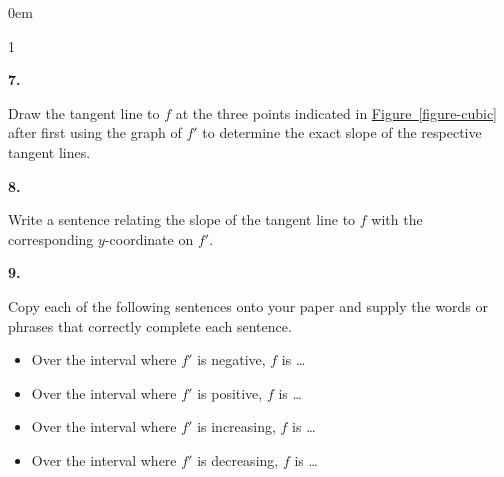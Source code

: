 \documentclass[12pt,]{book}
\theoremstyle{plain}
\theoremstyle{definition}
\numberwithin{equation}{section}
\newenvironment{exercisegroup}%
{\medskip\noindent}%
{\par\bigskip}%
\newlength{\exercisegroupindent}%
\newlength{\exercisegroupitemwidth}%
\newenvironment{exercisegrouplist}%
{\vspace{-\partopsep}%
\begin{adjustwidth}{\exercisegroupindent}{0em}}%
{\end{adjustwidth}%
\vspace{-\partopsep}%
\vspace{\baselineskip}}%
\newenvironment{exercisegroupbycol}[1]%
{\begin{exercisegrouplist}%
\vspace{-\multicolsep}%
\begin{multicols}{#1}%
\setlength{\parindent}{0em}%
\setlength{\exercisegroupitemwidth}{\linewidth}}%
{\end{multicols}%
\vspace{-\multicolsep}%
\end{exercisegrouplist}}%
\newenvironment{exercisegroupitem}[1]%
{\begin{minipage}[t]{\exercisegroupitemwidth}
\vspace{0pt}%
{\bfseries#1}%
\rule{0pt}{\baselineskip}}{\strut%
\end{minipage}%
\hspace{\columnsep}}%
\providecommand\phantomsection{}
\newcommand{\fd}[1]{#1'}
\begin{document}
\begin{exercisegroup}
\par
\begin{exercisegroupbycol}{1}%
\begin{exercisegroupitem}{7. }\phantomsection\hypertarget{exercise-216}{\null}
Draw the tangent line to \(f\) at the three points indicated in \hyperref[figure-cubic]{Figure~\ref*{figure-cubic}} after first using the graph of \(\fd{f}\) to determine the exact slope of the respective tangent lines.%
\end{exercisegroupitem}%
\par%
\begin{exercisegroupitem}{8. }\phantomsection\hypertarget{exercise-217}{\null}
Write a sentence relating the slope of the tangent line to \(f\) with the corresponding \(y\)-coordinate on \(\fd{f}\).%
\end{exercisegroupitem}%
\par%
\begin{exercisegroupitem}{9. }\phantomsection\hypertarget{exercise-218}{\null}
Copy each of the following sentences onto your paper and supply the words or phrases that correctly complete each sentence.%
\begin{itemize}[label=\textbullet]
\item{}Over the interval where \(\fd{f}\) is negative, \(f\) is \dots{}\item{}Over the interval where \(\fd{f}\) is positive, \(f\) is \dots{}\item{}Over the interval where \(\fd{f}\) is increasing, \(f\) is \dots{}\item{}Over the interval where \(\fd{f}\) is decreasing, \(f\) is \dots{}\end{itemize}
\end{exercisegroupitem}%
\par%
\end{exercisegroupbycol}%
\end{exercisegroup}%
\end{document}
